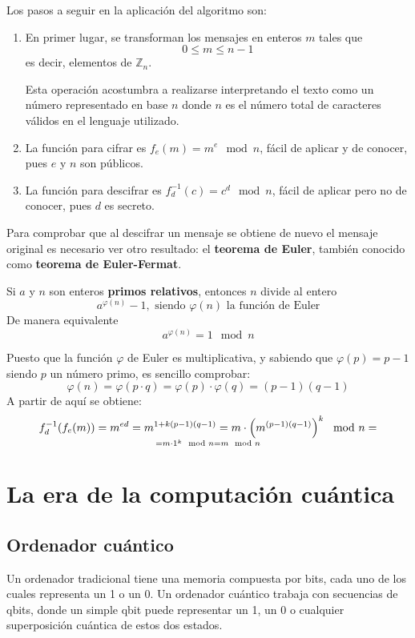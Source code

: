 \documentclass[nochap]{apuntesURJC}
\begin{document}
Los pasos a seguir en la aplicación del algoritmo son:
\begin{enumerate}
\item En primer lugar, se transforman los mensajes en enteros $m$ tales que
\[0 \leq m \leq n-1\]
es decir, elementos de $\mathbb{Z}_n$.

Esta operación acostumbra a realizarse interpretando el texto como un número representado en base $n$ donde $n$ es el número total de caracteres válidos en el lenguaje utilizado.

\item La función para cifrar es $f_e(m)=m^e \mod n$, fácil de aplicar y de conocer, pues $e$ y $n$ son públicos.

\item La función para descifrar es $f_d^{-1}(c)=c^d \mod n$, fácil de aplicar pero no de conocer, pues $d$ es secreto.

\end{enumerate}

Para comprobar que al descifrar un mensaje se obtiene de nuevo el mensaje original es necesario ver otro resultado: el \textbf{teorema de Euler}, también conocido como \textbf{teorema de Euler-Fermat}.

\begin{theorem}
Si $a$ y $n$ son enteros \textbf{primos relativos}, entonces $n$ divide al entero
\[a^{\varphi(n)}-1, \text{ siendo } \varphi(n) \text{ la función de Euler}\]
De manera equivalente
\[a^{\varphi(n)}=1 \mod n\]
\end{theorem}

Puesto que la función $\varphi$ de Euler es multiplicativa, y sabiendo que $\varphi(p)=p-1$ siendo $p$ un número primo, es sencillo comprobar:
\[\varphi(n) = \varphi(p\cdot q) = \varphi(p) \cdot \varphi(q) = (p-1)(q-1)\]
A partir de aquí se obtiene:
\[f_d^{-1}(f_e(m)) = m^{ed} = m^{1+k(p-1)(q-1)} = m \cdot \left(m^{(p-1)(q-1)}\right)^k\mod n = \atop = m \cdot 1^k \mod n = m \mod n\]

\section{La era de la computación cuántica}
\subsection{Ordenador cuántico}
Un ordenador tradicional tiene una memoria compuesta por bits, cada uno de los cuales representa un 1 o un 0. Un ordenador cuántico trabaja con secuencias de qbits, donde un simple qbit puede representar un 1, un 0 o cualquier superposición cuántica de estos dos estados.
\end{document}
